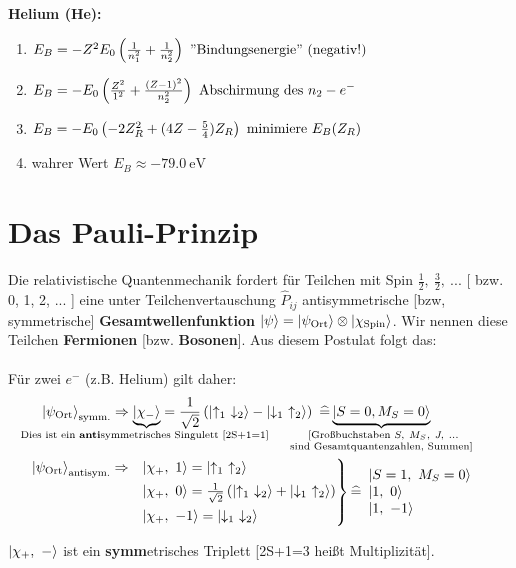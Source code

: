 \documentclass[Ex4_Zusammenfassung.tex]{subfiles}
\begin{document}
\textbf{Helium (He):}
\begin{enumerate}
	\item $E_B = - Z^2 E_0 \left( \frac{1}{n_1^2} + \frac{1}{n_2^2} \right) \ \text{''Bindungsenergie'' (negativ!)}$
	\item $E_B = - E_0 \left( \frac{Z^2}{1^2} + \frac{(Z-1)^2}{n_2^2} \right)\ \text{Abschirmung des } n_2-e^-$
	\item $E_B = -E_0 \left(-2Z_R^2 + (4Z - \frac{5}{4}) Z_R \right)\ \text{minimiere } E_B(Z_R) $
	\item wahrer Wert $ E_B \approx \SI{-79.0}{\eV}$
\end{enumerate}

\section{Das Pauli-Prinzip}
Die relativistische Quantenmechanik fordert für Teilchen mit Spin $\frac{1}{2},\ \frac{3}{2},\ ... $ [ bzw. 0, 1, 2, ... ] eine unter Teilchenvertauschung $\hat{P}_{ij} $ antisymmetrische [bzw, symmetrische] \textbf{Gesamtwellenfunktion} $ \ket{\psi} = \ket{\psi_{\text{Ort}}} \otimes \ket{\chi_{\text{Spin}}} $. Wir nennen diese Teilchen \textbf{Fermionen} [bzw. \textbf{Bosonen}]. Aus diesem Postulat folgt das:\\


\\

Für zwei $e^-$ (z.B. Helium) gilt daher:
\begin{align*}
	\ket{\psi_{\text{Ort}}}_{\text{symm.}} &\Rightarrow \underbrace{\ket{\chi_-}}_{\mathclap{\text{Dies ist ein \textbf{anti}symmetrisches Singulett [2S+1=1] }}} = \frac{1}{\sqrt{2}} \lp \ket{\uparrow_1\ \downarrow_2} - \ket{\downarrow_1\ \uparrow_2} \rp\  \widehat{=} \underbrace{\ket{S=0, M_S=0}}_{\mathclap{\substack{\text{ [Großbuchstaben } S,\ M_S,\ J,\ ... \\ \text{ sind Gesamtquantenzahlen, Summen] } }} }\\
	& \kern -5.95em \begin{rcases}
		\ket{\psi_{\text{Ort}}}_{\text{antisym.}} \Rightarrow &\ket{\chi_+ ,\ 1} = \ket{\uparrow_1\ \uparrow_2} \\
		&\ket{\chi_+ ,\ 0} = \frac{1}{\sqrt{2}} \lp \ket{\uparrow_1\ \downarrow_2} + \ket{\downarrow_1\ \uparrow_2} \rp\\
		&\ket{\chi_+ ,\ -1} = \ket{\downarrow_1\ \downarrow_2}
	\end{rcases} 
	\widehat{=} 
		\begin{array}{l}
			\ket{S=1,\ M_S=0}\\
			\ket{1,\ 0}\\
			\ket{1,\ -1}
		\end{array}
\end{align*}

$\ket{\chi_+,\ -}$ ist ein \textbf{symm}etrisches Triplett [2S+1=3 heißt Multiplizität].
\end{document}
